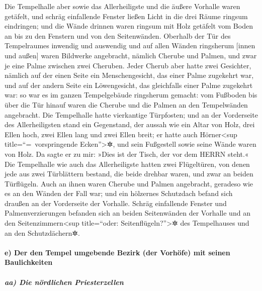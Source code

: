 Die Tempelhalle aber sowie das Allerheiligste und die äußere Vorhalle
waren getäfelt, und schräg einfallende Fenster ließen
Licht in die drei Räume ringsum eindringen; und die Wände drinnen waren
ringsum mit Holz getäfelt vom Boden an bis zu den Fenstern und von den
Seitenwänden. Oberhalb der Tür des Tempelraumes inwendig
und auswendig und auf allen Wänden ringsherum {[}innen und außen{]}
waren Bildwerke angebracht, nämlich Cherube und Palmen,
und zwar je eine Palme zwischen zwei Cheruben. Jeder Cherub aber hatte
zwei Gesichter, nämlich auf der einen Seite ein
Menschengesicht, das einer Palme zugekehrt war, und auf der andern Seite
ein Löwengesicht, das gleichfalls einer Palme zugekehrt war: so war es
im ganzen Tempelgebäude ringsherum gemacht: vom Fußboden
bis über die Tür hinauf waren die Cherube und die Palmen an den
Tempelwänden angebracht. Die Tempelhalle hatte
vierkantige Türpfosten; und an der Vorderseite des Allerheiligsten stand
ein Gegenstand, der aussah wie ein Altar von Holz, drei
Ellen hoch, zwei Ellen lang und zwei Ellen breit; er hatte auch
Hörner\textless sup title=``=~vorspringende Ecken''\textgreater✲, und
sein Fußgestell sowie seine Wände waren von Holz. Da sagte er zu mir:
»Dies ist der Tisch, der vor dem HERRN steht.« Die
Tempelhalle wie auch das Allerheiligste hatten zwei Flügeltüren,
von denen jede aus zwei Türblättern bestand, die beide
drehbar waren, und zwar an beiden Türflügeln. Auch an
ihnen waren Cherube und Palmen angebracht, geradeso wie es an den Wänden
der Fall war; und ein hölzernes Schutzdach befand sich draußen an der
Vorderseite der Vorhalle. Schräg einfallende Fenster und
Palmenverzierungen befanden sich an beiden Seitenwänden der Vorhalle und
an den Seitenzimmern\textless sup title=``oder:
Seitenflügeln?''\textgreater✲ des Tempelhauses und an den
Schutzdächern✲.

\hypertarget{e-der-den-tempel-umgebende-bezirk-der-vorhuxf6fe-mit-seinen-baulichkeiten}{%
\paragraph{e) Der den Tempel umgebende Bezirk (der Vorhöfe) mit seinen
Baulichkeiten}\label{e-der-den-tempel-umgebende-bezirk-der-vorhuxf6fe-mit-seinen-baulichkeiten}}

\hypertarget{aa-die-nuxf6rdlichen-priesterzellen}{%
\subparagraph{aa) Die nördlichen
Priesterzellen}\label{aa-die-nuxf6rdlichen-priesterzellen}}

